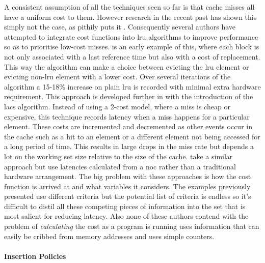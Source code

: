 A consistent assumption of all the techniques seen so far is that cache misses all have a uniform cost to them. However research in the recent past has shown this simply not the case, as \citet{qureshiCaseMLPAwareCache2006} pithily puts it . Consequently several authors have attempted to integrate cost functions into \gls{lru} algorithms to improve performance so as to prioritise low-cost misses. \citet{jeongCostsensitiveCacheReplacement2003} is an early example of this, where each block is not only associated with a last reference time but also with a cost of replacement. This way the algorithm can make a choice between evicting the \gls{lru} element or evicting non-\gls{lru} element with a lower cost. Over several iterations of the algorithm a 15-18\% increase on plain \gls{lru} is recorded with minimal extra hardware requirement. This approach is developed further in \citet{kharbutliLACSLocalityAwareCostSensitive2014} with the introduction of the \gls{lacs} algorithm. Instead of using a 2-cost model, where a miss is cheap or expensive, this technique records latency when a miss happens for a particular element. These costs are incremented and decremented as other events occur in the cache such as a hit to an element or a different element not being accessed for a long period of time. This results in large drops in the miss rate but depends a lot on the working set size relative to the size of the cache. \citet{dasLatencyAwareBlock2017} take a similar approach but use latencies calculated from a \gls{noc} rather than a traditional hardware arrangement. The big problem with these approaches is how the cost function is arrived at and what variables it considers. The examples previously presented use different criteria but the potential list of criteria is endless so it's difficult to distil all these competing pieces of information into the set that is most salient for reducing latency. Also none of these authors contend with the problem of \emph{calculating} the cost as a program is running \citet{jeongCostsensitiveCacheReplacement2003} uses information that can easily be cribbed from memory addresses and \citet{kharbutliLACSLocalityAwareCostSensitive2014} uses simple counters.

\paragraph{Insertion Policies}

